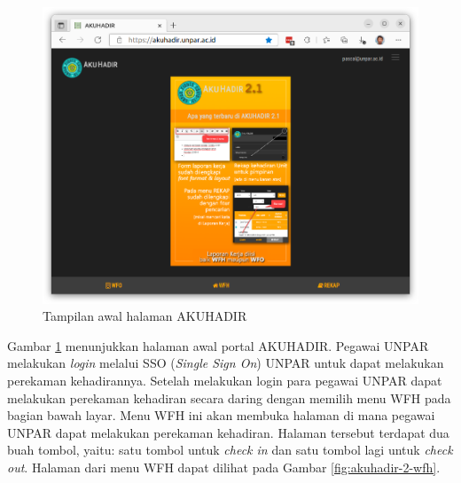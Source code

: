 \begin{figure}[H]
	\centering
	\includegraphics[scale=0.25]{Gambar/akuhadir-1-beranda.png}
	\caption{Tampilan awal halaman AKUHADIR} 
	\label{fig:akuhadir-1-beranda}
\end{figure}

Gambar \ref{fig:akuhadir-1-beranda} menunjukkan halaman awal portal AKUHADIR. Pegawai UNPAR melakukan \textit{login} melalui SSO (\textit{Single Sign On}) UNPAR untuk dapat melakukan perekaman kehadirannya. Setelah melakukan login para pegawai UNPAR dapat melakukan perekaman kehadiran secara daring dengan memilih menu WFH pada bagian bawah layar. Menu WFH ini akan membuka halaman di mana pegawai UNPAR dapat melakukan perekaman kehadiran. Halaman tersebut terdapat dua buah tombol, yaitu: satu tombol untuk \textit{check in} dan satu tombol lagi untuk \textit{check out}. Halaman dari menu WFH dapat dilihat pada Gambar \ref{fig:akuhadir-2-wfh}.


